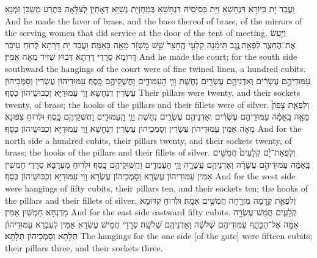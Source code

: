 {וַעֲבַד יָת כִּיּוֹרָא דִּנְחָשָׁא וְיָת בְּסִיסֵיהּ דִּנְחָשָׁא בְּמִחְזְיָת נְשַׁיָּא דְּאָתְיָן לְצַלָּאָה בִּתְרַע מַשְׁכַּן זִמְנָא׃}
{And he made the laver of brass, and the base thereof of brass, of the mirrors of the serving women that did service at the door of the tent of meeting.}{}
{וַיַּ֖עַשׂ אֶת־הֶחָצֵ֑ר לִפְאַ֣ת \legarmeh  נֶ֣גֶב תֵּימָ֗נָה קַלְעֵ֤י הֶֽחָצֵר֙ שֵׁ֣שׁ מׇשְׁזָ֔ר מֵאָ֖ה בָּאַמָּֽה׃}
{וַעֲבַד יָת דָּרְתָא לְרוּחַ עֵיבַר דָּרוֹמָא סְרָדֵי דָּרְתָא דְּבוּץ שְׁזִיר מְאָה אַמִּין׃}
{And he made the court; for the south side southward the hangings of the court were of fine twined linen, a hundred cubits.}{}
{עַמּוּדֵיהֶ֣ם עֶשְׂרִ֔ים וְאַדְנֵיהֶ֥ם עֶשְׂרִ֖ים נְחֹ֑שֶׁת וָוֵ֧י הָעַמּוּדִ֛ים וַחֲשֻׁקֵיהֶ֖ם כָּֽסֶף׃}
{עַמּוּדֵיהוֹן עֶשְׂרִין וְסָמְכֵיהוֹן עֶשְׂרִין דִּנְחָשָׁא וָוֵי עַמּוּדַיָּא וְכִבּוּשֵׁיהוֹן כְּסַף׃}
{Their pillars were twenty, and their sockets twenty, of brass; the hooks of the pillars and their fillets were of silver.}{}
{וְלִפְאַ֤ת צָפוֹן֙ מֵאָ֣ה בָֽאַמָּ֔ה עַמּוּדֵיהֶ֣ם עֶשְׂרִ֔ים וְאַדְנֵיהֶ֥ם עֶשְׂרִ֖ים נְחֹ֑שֶׁת וָוֵ֧י הָֽעַמּוּדִ֛ים וַחֲשֻׁקֵיהֶ֖ם כָּֽסֶף׃}
{וּלְרוּחַ צִפּוּנָא מְאָה אַמִּין עַמּוּדֵיהוֹן עֶשְׂרִין וְסָמְכֵיהוֹן עֶשְׂרִין דִּנְחָשָׁא וָוֵי עַמּוּדַיָּא וְכִבּוּשֵׁיהוֹן כְּסַף׃}
{And for the north side a hundred cubits, their pillars twenty, and their sockets twenty, of brass; the hooks of the pillars and their fillets of silver.}{}
{וְלִפְאַת־יָ֗ם קְלָעִים֙ חֲמִשִּׁ֣ים בָּֽאַמָּ֔ה עַמּוּדֵיהֶ֣ם עֲשָׂרָ֔ה וְאַדְנֵיהֶ֖ם עֲשָׂרָ֑ה וָוֵ֧י הָעַמֻּדִ֛ים וַחֲשׁוּקֵיהֶ֖ם כָּֽסֶף׃}
{וּלְרוּחַ מַעְרָבָא סְרָדֵי חַמְשִׁין אַמִּין עַמּוּדֵיהוֹן עֶשְׂרָא וְסָמְכֵיהוֹן עֶשְׂרָא וָוֵי עַמּוּדַיָּא וְכִבּוּשֵׁיהוֹן כְּסַף׃}
{And for the west side were hangings of fifty cubits, their pillars ten, and their sockets ten; the hooks of the pillars and their fillets of silver.}{}
{וְלִפְאַ֛ת קֵ֥דְמָה מִזְרָ֖חָה חֲמִשִּׁ֥ים אַמָּֽה׃}
{וּלְרוּחַ קִדּוּמָא מַדְנְחָא חַמְשִׁין אַמִּין׃}
{And for the east side eastward fifty cubits.}{}
{קְלָעִ֛ים חֲמֵשׁ־עֶשְׂרֵ֥ה אַמָּ֖ה אֶל־הַכָּתֵ֑ף עַמּוּדֵיהֶ֣ם שְׁלֹשָׁ֔ה וְאַדְנֵיהֶ֖ם שְׁלֹשָֽׁה׃}
{סְרָדֵי חֲמֵישׁ עֶשְׂרָא אַמִּין לְעִבְרָא עַמּוּדֵיהוֹן תְּלָתָא וְסָמְכֵיהוֹן תְּלָתָא׃}
{The hangings for the one side [of the gate] were fifteen cubits; their pillars three, and their sockets three.}{}
